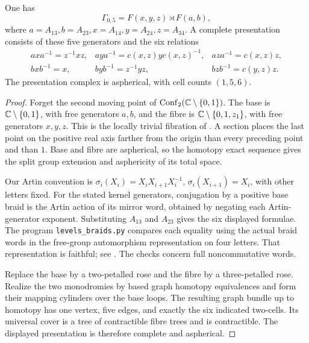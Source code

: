 \begin{proposition}
\label{P5c2}
One has
\[
                \Gamma_{0,5}=F(x,y,z)\rtimes F(a,b),
\]
where \(a=A_{13}, b=A_{23}, x=A_{14}, y=A_{24}, z=A_{34}\).
A complete presentation consists of these five generators
and the six relations
\[
\begin{array}{lll}
 axa^{-1}=z^{-1}xz,&
 aya^{-1}=c(x,z)y c(x,z)^{-1},&
 aza^{-1}=c(x,z)z,\\[2pt]
 bxb^{-1}=x,&
 byb^{-1}=z^{-1}yz,&
 bzb^{-1}=c(y,z)z .
\end{array}
\]
The presentation complex is aspherical, with cell
counts \((1,5,6)\).
\end{proposition}

\begin{proof}
Forget the second moving point of
\(\operatorname{Conf}_2(\mathbb C\setminus\{0,1\})\).
The base is \(\mathbb C\setminus\{0,1\}\), with free
generators \(a,b\), and the fibre is
\(\mathbb C\setminus\{0,1,z_1\}\), with free generators
\(x,y,z\). This is the locally trivial fibration of
\citet[Theorem 1]{FadellNeuwirth1962}.
A section places the last point on the positive
real axis farther from the origin than every
preceding point and than \(1\). Base and fibre
are aspherical, so the homotopy exact sequence
gives the split group extension and asphericity
of its total space.

Our Artin convention is
\(\sigma_i(X_i)=X_iX_{i+1}X_i^{-1}\),
\(\sigma_i(X_{i+1})=X_i\), with other letters fixed.
For the stated kernel generators, conjugation
by a positive base braid is the Artin action of
its mirror word, obtained by negating each
Artin-generator exponent. Substituting \(A_{13}\)
and \(A_{23}\) gives the six displayed formulae.
The program \texttt{levels\_braids.py} compares
each equality using the actual braid words in
the free-group automorphism representation on
four letters. That representation is faithful;
see \citet[Theorem A, representation (1),
parameter \(1\)]{Shpilrain2001}.
The checks concern full noncommutative words.

Replace the base by a two-petalled rose and
the fibre by a three-petalled rose. Realize the
two monodromies by based graph homotopy
equivalences and form their mapping cylinders
over the base loops. The resulting graph bundle
up to homotopy has one vertex, five edges,
and exactly the six indicated two-cells.
Its universal cover is a tree of contractible
fibre trees and is contractible. The displayed
presentation is therefore complete and
aspherical.
\end{proof}

